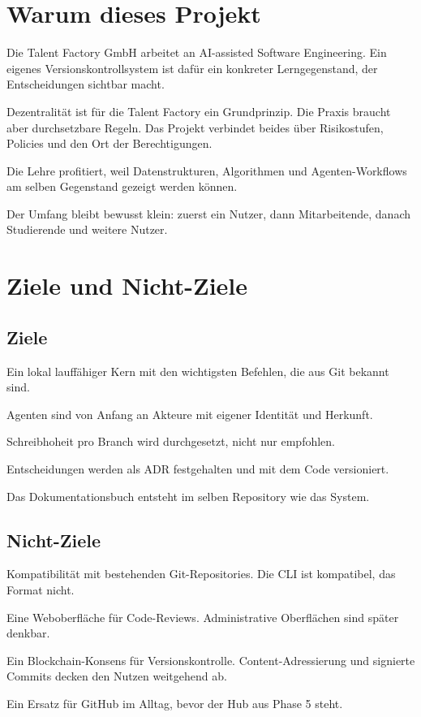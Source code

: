 \section{Warum dieses Projekt}

\startitemize
\item Die Talent Factory GmbH arbeitet an AI-assisted Software Engineering. Ein eigenes Versionskontrollsystem ist dafür ein konkreter Lerngegenstand, der Entscheidungen sichtbar macht.
\item Dezentralität ist für die Talent Factory ein Grundprinzip. Die Praxis braucht aber durchsetzbare Regeln. Das Projekt verbindet beides über Risikostufen, Policies und den Ort der Berechtigungen.
\item Die Lehre profitiert, weil Datenstrukturen, Algorithmen und Agenten-Workflows am selben Gegenstand gezeigt werden können.
\item Der Umfang bleibt bewusst klein: zuerst ein Nutzer, dann Mitarbeitende, danach Studierende und weitere Nutzer.
\stopitemize

\section{Ziele und Nicht-Ziele}

\subsection{Ziele}

\startitemize
\item Ein lokal lauffähiger Kern mit den wichtigsten Befehlen, die aus Git bekannt sind.
\item Agenten sind von Anfang an Akteure mit eigener Identität und Herkunft.
\item Schreibhoheit pro Branch wird durchgesetzt, nicht nur empfohlen.
\item Entscheidungen werden als ADR festgehalten und mit dem Code versioniert.
\item Das Dokumentationsbuch entsteht im selben Repository wie das System.
\stopitemize

\subsection{Nicht-Ziele}

\startitemize
\item Kompatibilität mit bestehenden Git-Repositories. Die CLI ist kompatibel, das Format nicht.
\item Eine Weboberfläche für Code-Reviews. Administrative Oberflächen sind später denkbar.
\item Ein Blockchain-Konsens für Versionskontrolle. Content-Adressierung und signierte Commits decken den Nutzen weitgehend ab.
\item Ein Ersatz für GitHub im Alltag, bevor der Hub aus Phase 5 steht.
\stopitemize

